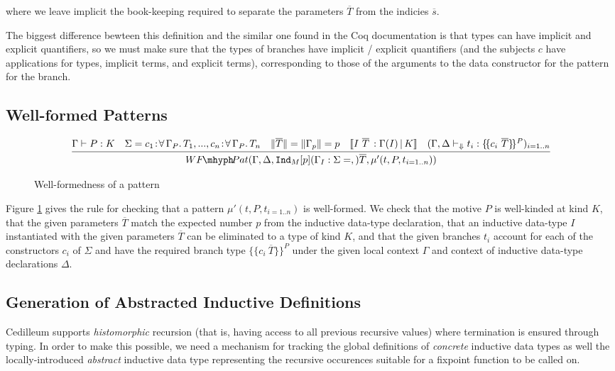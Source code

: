 \documentclass{article}
\newcommand{\ann}[2]{#1\! : \! #2}
\newcommand{\absu}[3]{{#1}\, #2.\, #3}
\newcommand{\indast}[5]{\texttt{Ind}_{#1} [#2] (#3 : #4 = #5)}
\newcommand{\lenc}[1]{\|#1\|}
\newcommand{\vars}[1]{{\overline{#1}}}
\newcommand{\decchk}{\vdash_{\Downarrow}}
\newcommand{\wfpat}[4]{WF\!\mhyph\!Pat(#1,#2,#3,#4)}
\newcommand{\llbrace}{\{\!\{}
\newcommand{\rrbrace}{\}\!\}}
\begin{document}
\noindent where we leave implicit the book-keeping required to separate the
parameters $\vars{T}$ from the indicies $\vars{s}$.

The biggest difference bewteen this definition and the similar one found in the
Coq documentation is that types can have implicit and explicit quantifiers, so
we must make sure that the types of branches have implicit / explicit
quantifiers (and the subjects $c$ have applications for types, implicit terms, and
explicit terms), corresponding to those of the arguments to the data constructor
for the pattern for the branch.

\subsection{Well-formed Patterns}
\label{ssec:pattern-wf-pat}

\begin{figure}[h]
  \caption{Well-formedness of a pattern}
  \label{fig:wf-pattern}
  \[
    \infer
    { \wfpat{\Gamma,\Delta}{\indast{M}{p}{\Gamma_I}{\Sigma}}{\vars{T}}{\mu'(t,P,t_{i=1..n})}
    }
    { \Gamma \vdash P : K
      \quad \Sigma = \ann{c_1}{\absu{\forall}{\Gamma_P}{T_1}}, ..., \ann{c_n}{\absu{\forall}{\Gamma_P}{T_n}}
      \quad \lenc{\vars{T}} = \lenc{\Gamma_p} = p
      \quad \llbracket I\ \vars{T}\, : \Gamma(I)\, |\, K \rrbracket
      \quad (\Gamma,\Delta \decchk t_i : \llbrace c_i\ \vars{T} \rrbrace^P)_{i=1..n}
    }
  \]
\end{figure}

Figure \ref{fig:wf-pattern} gives the rule for checking that a pattern
$\mu'(t,P,t_{i=1..n})$ is well-formed. We check that the motive $P$ is
well-kinded at kind $K$, that the given parameters $\vars{T}$ match the expected
number $p$ from the inductive data-type declaration, that an inductive data-type
$I$ instantiated with the given parameters $\vars{T}$ can be eliminated to a
type of kind $K$, and that the given branches $t_i$ account for each of the
constructors $c_i$ of $\Sigma$ and have the required branch type $\llbrace c_i\
\vars{T} \rrbrace^P$ under the given local context $\Gamma$ and context of
inductive data-type declarations $\Delta$.

\subsection{Generation of Abstracted Inductive Definitions}
\label{ssec:patern-abstracted-gen}

Cedilleum supports \textit{histomorphic} recursion (that is, having access to
all previous recursive values) where termination is ensured
through typing. In order to make this possible, we need a mechanism for tracking
the global definitions of \textit{concrete} inductive data types as well the
locally-introduced \textit{abstract} inductive data type representing the
recursive occurences suitable for a fixpoint function to be called on.
\end{document}
